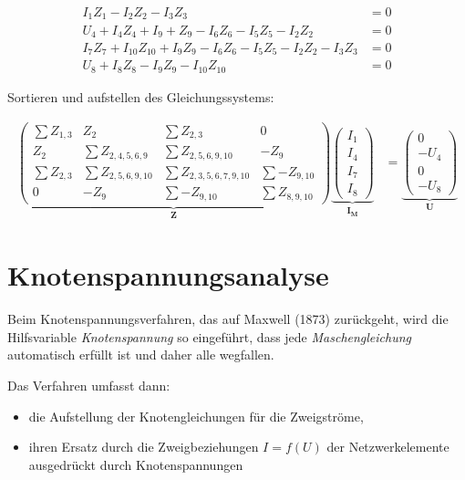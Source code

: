\documentclass[
  ngerman,
  letterpaper,
]{scrbook}
\begin{document}
\begin{align}
I_1Z_1 - I_2Z_2 - I_3Z_3 &= 0 \\
U_4 + I_4Z_4 + I_9+Z_9 - I_6Z_6 - I_5Z_5 - I_2Z_2 &= 0 \\
I_7Z_7 + I_{10}Z_{10} + I_9Z_9 - I_6Z_6 - I_5Z_5 - I_2Z_2 -
I_3Z_3 &= 0 \\
U_8 + I_8Z_8 - I_9Z_9 - I_{10}Z_{10} &= 0
\end{align}

Sortieren und aufstellen des Gleichungssystems:

\begin{align}
\underbrace{\begin{pmatrix}
\sum Z_{1,3} & Z_2 & \sum Z_{2,3} & 0 \\
Z_2 & \sum Z_{2,4,5,6,9} & \sum Z_{2,5,6,9,10} & -Z_9 \\
\sum Z_{2,3} & \sum Z_{2,5,6,9,10} & \sum Z_{2,3,5,6,7,9,10} &
\sum -Z_{9,10} \\
0 & -Z_9 & \sum -Z_{9,10} & \sum Z_{8,9,10}
\end{pmatrix}}_{\mathbf{Z}}
\underbrace{\begin{pmatrix}
I_1 \\
I_4 \\
I_7 \\
I_8
\end{pmatrix}}_{\mathbf{I_M}}
&=
\underbrace{\begin{pmatrix}
0 \\
-U_4 \\
0 \\
-U_8
\end{pmatrix}}_{\mathbf{U}}
\end{align}

\section{Knotenspannungsanalyse}\label{knotenspannungsanalyse}

Beim Knotenspannungsverfahren, das auf Maxwell (1873) zurückgeht, wird
die Hilfsvariable \emph{Knotenspannung} so eingeführt, dass jede
\emph{Maschengleichung} automatisch erfüllt ist und daher alle
wegfallen.

Das Verfahren umfasst dann:

\begin{itemize}
\item
  die Aufstellung der Knotengleichungen für die Zweigströme,
\item
  ihren Ersatz durch die Zweigbeziehungen \(I=f(U)\) der
  Netzwerkelemente ausgedrückt durch Knotenspannungen
\end{itemize}
\end{document}
